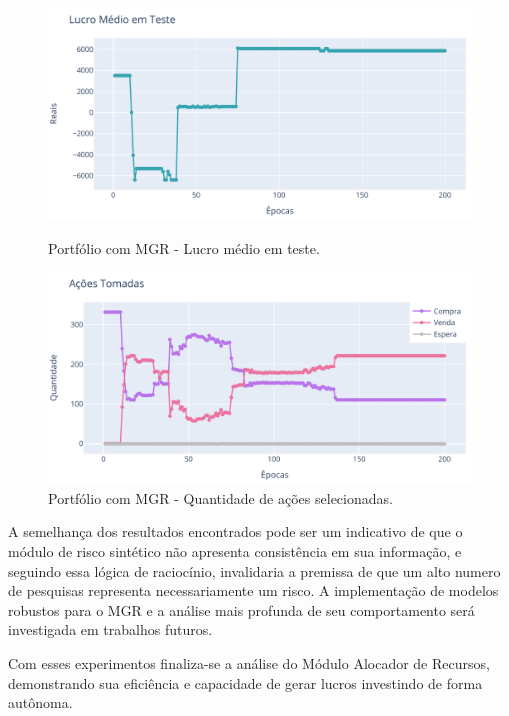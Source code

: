 \begin{figure}[htbp]
    \centering 
    \begin{minipage}[b]{0.45\linewidth}
        \includegraphics[width=\linewidth]{img/ddpg/all/risk/profit_test.pdf}
        \caption{Portfólio com \acrshort{MGR} - Lucro médio em teste.} 
        \label{all_risk_profit}
    \end{minipage}
    \quad
    \begin{minipage}[b]{0.45\linewidth}
        \includegraphics[width=\linewidth]{img/ddpg/all/risk/actions.pdf}
        \caption{Portfólio com \acrshort{MGR} - Quantidade de ações selecionadas.}
        \label{all_risk_act}
    \end{minipage}
\end{figure}

A semelhança dos resultados encontrados pode ser um indicativo de que o módulo de risco sintético não apresenta consistência em sua informação, e seguindo essa lógica de raciocínio, invalidaria a premissa de que um alto numero de pesquisas representa necessariamente um risco. A implementação de modelos robustos para o \acrshort{MGR} e a análise mais profunda de seu comportamento será investigada em trabalhos futuros.

Com esses experimentos finaliza-se a análise do Módulo Alocador de Recursos, demonstrando sua eficiência e capacidade de gerar lucros investindo de forma autônoma. 

